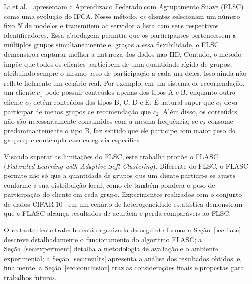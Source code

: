Li et al.~\cite{flsc} apresentam o Aprendizado Federado com Agrupamento Suave (FLSC) como uma evolução do IFCA.
Nesse método, os clientes selecionam um número fixo $N$ de modelos e transmitem ao servidor a lista com seus respectivos identificadores.
Essa abordagem permitiu que os participantes pertencessem a múltiplos grupos simultaneamente e,
graças a essa flexibilidade, o FLSC demonstrou capturar melhor a natureza dos dados não-IID.
Contudo, o método impõe que todos os clientes participem de uma quantidade rígida de grupos,
atribuindo sempre o mesmo peso de participação a cada um deles.
Isso ainda não reflete fielmente um cenário real.
Por exemplo, em um sistema de recomendação, um cliente $c_1$ pode possuir conteúdos apenas dos tipos A e B,
enquanto outro cliente $c_2$ detém conteúdos dos tipos B, C, D e E.
É natural supor que $c_1$ deva participar de menos grupos de recomendação que $c_2$.
Além disso, os conteúdos não são necessariamente consumidos com a mesma frequência;
se $c_2$ consome predominantemente o tipo B,
faz sentido que ele participe com maior peso do grupo que contempla essa categoria específica.

Visando superar as limitações do FLSC, este trabalho propõe o FLASC (\textit{Federated Learning with Adaptive Soft Clustering}).
Diferente do FLSC, o FLASC permite não só que a quantidade de grupos que um cliente participe se ajuste conforme a sua distribuição local,
como ele também pondera o peso de participação do cliente em cada grupo.
Experimentos realizados com o conjunto de dados CIFAR-10~\cite{cifar10} em um cenário de heterogeneidade estatística
demonstram que o FLASC alcança resultados de acurácia e perda comparáveis ao FLSC.

O restante deste trabalho está organizado da seguinte forma:
a Seção~\ref{sec:flasc} descreve detalhadamente o funcionamento do algoritmo FLASC;
a Seção~\ref{sec:experiment} detalha a metodologia de avaliação e o ambiente experimental;
a Seção~\ref{sec:results} apresenta a análise dos resultados obtidos;
e, finalmente, a Seção~\ref{sec:conclusion} traz as considerações finais e propostas para trabalhos futuros.
